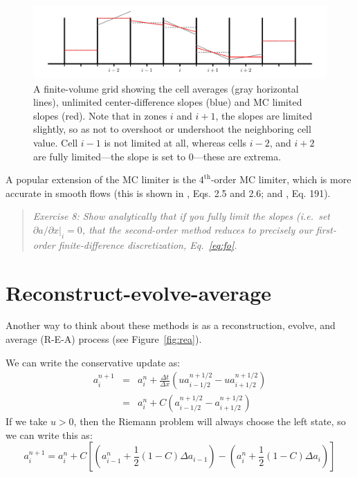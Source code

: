 \documentclass[11pt]{article}
\begin{document}
\begin{figure}
\centering
\includegraphics[width=6.0in]{generalgrid}
\caption{\label{fig:limit} A finite-volume grid showing the cell
  averages (gray horizontal lines), unlimited center-difference slopes
  (blue) and MC limited slopes (red).  Note that in zones $i$ and
  $i+1$, the slopes are limited slightly, so as not to overshoot or
  undershoot the neighboring cell value.  Cell $i-1$ is not limited at
  all, whereas cells $i-2$, and $i+2$ are fully limited---the slope is
  set to 0---these are extrema.}
\end{figure}

A popular extension of the MC limiter is the $4^\mathrm{th}$-order MC
limiter, which is more accurate in smooth flows (this is shown in
\cite{colella:1985}, Eqs. 2.5 and 2.6; and \cite{colella:1990},
Eq. 191).

\begin{quote}
{\em Exercise 8: Show analytically that if you fully limit the slopes
  (i.e.\ set $\partial a/\partial x |_i = 0$, that the second-order
  method reduces to precisely our first-order finite-difference discretization,
  Eq.~\ref{eq:fo}.  }
\end{quote}


\section{Reconstruct-evolve-average}

Another way to think about these methods is as a reconstruction,
evolve, and average (R-E-A) process (see Figure~\ref{fig:rea}).  

We can write the conservative update as:
\begin{eqnarray}
a_i^{n+1} &=& a_i^n + \frac{\Delta t}{\Delta x} 
    (u a^{n+1/2}_{i-1/2} - u a^{n+1/2}_{i+1/2} ) \\
          &=& a_i^n + C (a^{n+1/2}_{i-1/2} - a^{n+1/2}_{i+1/2} ) 
\end{eqnarray}
If we take $u > 0$, then the Riemann problem will always choose the
left state, so we can write this as:
\begin{equation}
a_i^{n+1} = a_i^n + 
     C \left [\left (a_{i-1}^n + \frac{1}{2} (1-C) \Delta a_{i-1} \right ) -
              \left (a_{i}^n + \frac{1}{2} (1-C) \Delta a_{i} \right ) 
       \right ] \label{eq:rea_orig}
\end{equation}
\end{document}
